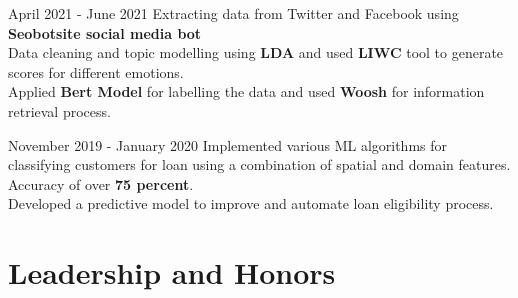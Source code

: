 \documentclass[]{Keval-resume}
\begin{document}
\begin{flushleft}
\sectionsep
{}  {April 2021 - June 2021}
\textbullet{}  Extracting data from Twitter and Facebook using \textbf{Seobotsite social media bot} \\
\textbullet{} Data cleaning and topic modelling using \textbf{LDA} and used \textbf{LIWC} tool to generate scores for different emotions. \\
\textbullet{} Applied \textbf{Bert Model} for labelling the data and used \textbf{Woosh} for information retrieval process.


\sectionsep

  {November 2019 - January 2020}
\textbullet{}  Implemented various ML algorithms for classifying customers for loan using a combination of spatial and domain features. Accuracy of over \textbf{75 percent}. \\
\textbullet{} Developed a predictive model to improve and automate loan eligibility process. \\

\sectionsep


%


\iffalse
\section{Leadership and Honors} 
\hrulefill





\end{flushleft}
\end{document}
